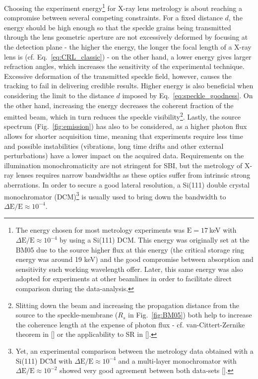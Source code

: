 \begin{refsection}
Choosing the experiment energy\footnote{The energy chosen for most metrology experiments was $\text{E}=17~$keV with $\Delta \text{E}/\text{E}\approx10^{-4}$ by using a Si(111) DCM. This energy was originally set at the BM05 due to the source higher flux at this energy (the critical storage ring energy was around 19 keV) and the good compromise between absorption and sensitivity such working wavelength offer. Later, this same energy was also adopted for experiments at other beamlines in order to facilitate direct comparison during the data-analysis.} for X-ray lens metrology is about reaching a compromise between several competing constraints. For a fixed distance $d$, the energy should be high enough so that the speckle grains being transmitted through the lens geometric aperture are not excessively deformed by focusing at the detection plane - the higher the energy, the longer the focal length of a X-ray lens is (cf. Eq.~\ref{eq:CRL_classic}) - on the other hand, a lower energy gives larger refraction angles, which increases the sensitivity of the experimental technique. Excessive deformation of the transmitted speckle field, however, causes the tracking to fail in delivering credible results. Higher energy is also beneficial when considering the limit to the distance $d$ imposed by Eq.~\ref{eq:speckle_goodness}. On the other hand, increasing the energy decreases the coherent fraction of the emitted beam, which in turn reduces the speckle visibility\footnote{Slitting down the beam and increasing the propagation distance from the source to the speckle-membrane ($R_s$ in Fig.~\ref{fig:BM05}) both help to increase the coherence length at the expense of photon flux - cf. van-Cittert-Zernike theorem in [\cite[\textit{§4.4.4}]{Mandel1995}] or the applicability to SR in [\cite[\textit{§4}]{Geloni2008}].}. Lastly, the source spectrum (Fig.~\ref{fig:emission}) has also to be considered, as a higher photon flux allows for shorter acquisition time, meaning that experiments require less time and possible instabilities (vibrations, long time drifts and other external perturbations) have a lower impact on the acquired data. Requirements on the illumination monochromaticity are not stringent for SBI, but the metrology of X-ray lenses requires narrow bandwidths as these optics suffer from intrinsic strong aberrations. In order to secure a good lateral resolution, a Si(111) double crystal monochromator (DCM)\footnote{Yet, an experimental comparison between the metrology data obtained with a Si(111) DCM with $\Delta \text{E}/\text{E}\approx10^{-4}$ and a multi-layer monochromator with $\Delta \text{E}/\text{E}\approx10^{-2}$ showed very good agreement between both data-sets [\cite[\textit{\S3.3.3}]{Berujon2020a}].} is usually used to bring down the bandwidth to $\Delta \text{E}/\text{E}\approx10^{-4}$.


\end{refsection}

